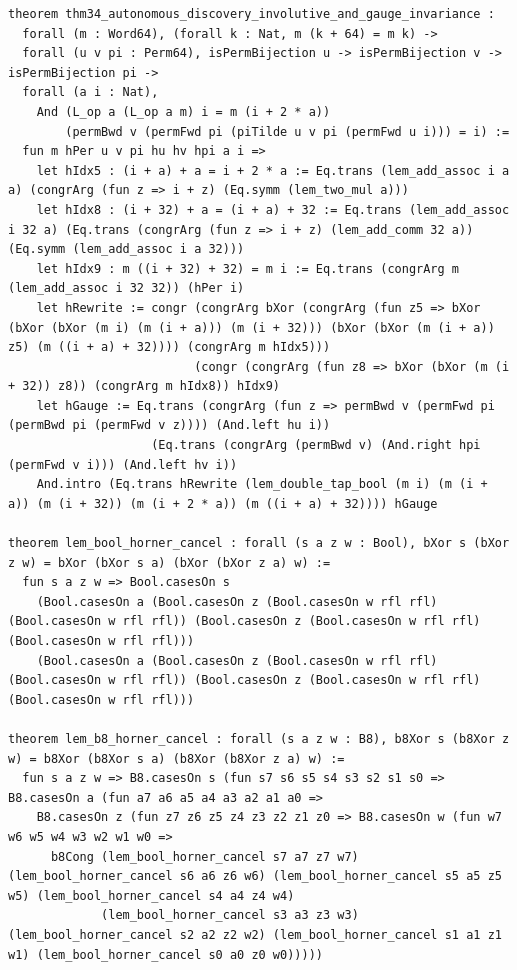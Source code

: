 \documentclass[11pt,letterpaper]{article}
\theoremstyle{spectralthm}
\begin{document}
\begin{lstlisting}[language=Lean4,caption={Standalone Pure Init.Prelude Term-Mode Lean 4 Kernel Suite (thm30--thm61, v0.0.0, 0 sorry, 0 axioms).},label={lst:lean_unified}]
theorem thm34_autonomous_discovery_involutive_and_gauge_invariance :
  forall (m : Word64), (forall k : Nat, m (k + 64) = m k) ->
  forall (u v pi : Perm64), isPermBijection u -> isPermBijection v -> isPermBijection pi ->
  forall (a i : Nat),
    And (L_op a (L_op a m) i = m (i + 2 * a))
        (permBwd v (permFwd pi (piTilde u v pi (permFwd u i))) = i) :=
  fun m hPer u v pi hu hv hpi a i =>
    let hIdx5 : (i + a) + a = i + 2 * a := Eq.trans (lem_add_assoc i a a) (congrArg (fun z => i + z) (Eq.symm (lem_two_mul a)))
    let hIdx8 : (i + 32) + a = (i + a) + 32 := Eq.trans (lem_add_assoc i 32 a) (Eq.trans (congrArg (fun z => i + z) (lem_add_comm 32 a)) (Eq.symm (lem_add_assoc i a 32)))
    let hIdx9 : m ((i + 32) + 32) = m i := Eq.trans (congrArg m (lem_add_assoc i 32 32)) (hPer i)
    let hRewrite := congr (congrArg bXor (congrArg (fun z5 => bXor (bXor (bXor (m i) (m (i + a))) (m (i + 32))) (bXor (bXor (m (i + a)) z5) (m ((i + a) + 32)))) (congrArg m hIdx5)))
                          (congr (congrArg (fun z8 => bXor (bXor (m (i + 32)) z8)) (congrArg m hIdx8)) hIdx9)
    let hGauge := Eq.trans (congrArg (fun z => permBwd v (permFwd pi (permBwd pi (permFwd v z)))) (And.left hu i))
                    (Eq.trans (congrArg (permBwd v) (And.right hpi (permFwd v i))) (And.left hv i))
    And.intro (Eq.trans hRewrite (lem_double_tap_bool (m i) (m (i + a)) (m (i + 32)) (m (i + 2 * a)) (m ((i + a) + 32)))) hGauge

theorem lem_bool_horner_cancel : forall (s a z w : Bool), bXor s (bXor z w) = bXor (bXor s a) (bXor (bXor z a) w) :=
  fun s a z w => Bool.casesOn s
    (Bool.casesOn a (Bool.casesOn z (Bool.casesOn w rfl rfl) (Bool.casesOn w rfl rfl)) (Bool.casesOn z (Bool.casesOn w rfl rfl) (Bool.casesOn w rfl rfl)))
    (Bool.casesOn a (Bool.casesOn z (Bool.casesOn w rfl rfl) (Bool.casesOn w rfl rfl)) (Bool.casesOn z (Bool.casesOn w rfl rfl) (Bool.casesOn w rfl rfl)))

theorem lem_b8_horner_cancel : forall (s a z w : B8), b8Xor s (b8Xor z w) = b8Xor (b8Xor s a) (b8Xor (b8Xor z a) w) :=
  fun s a z w => B8.casesOn s (fun s7 s6 s5 s4 s3 s2 s1 s0 => B8.casesOn a (fun a7 a6 a5 a4 a3 a2 a1 a0 =>
    B8.casesOn z (fun z7 z6 z5 z4 z3 z2 z1 z0 => B8.casesOn w (fun w7 w6 w5 w4 w3 w2 w1 w0 =>
      b8Cong (lem_bool_horner_cancel s7 a7 z7 w7) (lem_bool_horner_cancel s6 a6 z6 w6) (lem_bool_horner_cancel s5 a5 z5 w5) (lem_bool_horner_cancel s4 a4 z4 w4)
             (lem_bool_horner_cancel s3 a3 z3 w3) (lem_bool_horner_cancel s2 a2 z2 w2) (lem_bool_horner_cancel s1 a1 z1 w1) (lem_bool_horner_cancel s0 a0 z0 w0)))))


\end{lstlisting}
\end{document}
